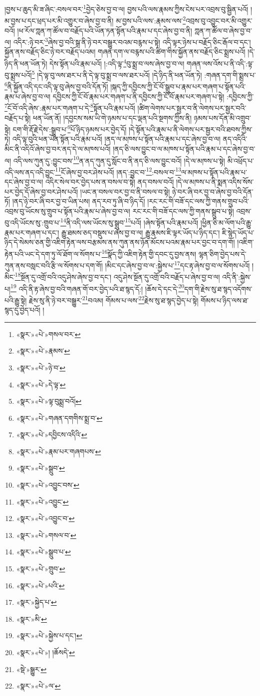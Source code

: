 །བྱས་པ་ཆུད་མི་ཟ་ཞིང་:བསལ་བར་\footnote{«སྣར་»«པེ་»གསལ་བར་}བྱེད་ཅེས་བྱ་བ་ལ། བྱས་པའི་ལས་རྣམས་ཀྱིས་ངེས་པར་འབྲས་བུ་སྦྱིན་པའོ། །མ་བྱས་པ་དང་ཕྲད་པར་མི་འགྱུར་བ་ཞེས་བྱ་བ་ནི། མ་བྱས་པའི་ལས་:རྣམས་ལས་\footnote{«སྣར་»«པེ་»རྣམས་}འབྲས་བུ་འབྱུང་བར་མི་འགྱུར་བའོ། །ཕ་རོལ་ཀླན་ཀ་ཚོལ་བ་བརྗོད་པའི་ཡོན་ཏན་སྟོན་པའི་རྣམ་པ་དང་ཞེས་བྱ་བ་ནི། ཀླན་ཀ་ཚོལ་བ་ཞེས་བྱ་བ་ལ། འདིར་:ཉེ་བར་\footnote{«སྣར་»«པེ་»ཉེ་བ་}ཞེས་བྱ་བའི་སྒྲ་ནི་ཉེ་བར་བསྒྱུར་བའམ་བརྙས་པ་སྟེ། འདི་ལྟར་ཉེས་པ་བརྗོད་ཅིང་རྒོལ་བ་དང་། སྐྱོན་ནས་བརྗོད་ཅིང་ཉེ་བར་བརྗོད་པའམ། གཞན་དག་ལ་བརྙས་པའི་ཚིག་གིས་སྐྱོན་ནས་བརྗོད་ཅིང་སྨྲས་པའོ། །དེ་ཉིད་ནི་ཕན་ཡོན་ཏེ། དེས་སྟོན་པའི་རྣམ་པའོ། །:འདི་ལྟ་\footnote{«སྣར་»«པེ་»དེ་ལྟ་}བུ་སྨྲ་བ་ལས་ཞེས་བྱ་བ་ལ། གཞན་ལས་འོས་པ་ནི་འདི་:ལྟ་བུ་སྨྲས་པའོ།\footnote{«སྣར་»«པེ་»ལྟ་བུསྨྲ་བའོ།} །དེ་ལྟ་བུ་ལས་ཐར་པ་ནི་དེ་ལྟ་བུ་སྨྲ་བ་ལས་ཐར་པའོ། །དེ་ཉིད་ནི་ཕན་ཡོན་ཏེ། :གཞན་དག་གི་སྨྲས་པ་\footnote{«སྣར་»«པེ་»གཞན་དགགིས་སྨྲ་བ་}ནི་སྐྱོན་འདི་དང་འདི་ལྟ་བུ་ཞེས་བྱ་བའི་དོན་ཏོ། །སྐད་ཀྱི་དབྱིངས་ཀྱི་ངོ་བོ་སྒྲུབ་པ་རྣམ་པར་གཞག་པ་སྟོན་པའི་རྣམ་པ་ཞེས་བྱ་བ་ལ། དབྱིངས་ཀྱི་ངོ་བོ་རྣམ་པར་གཞག་པ་ནི་དབྱིངས་ཀྱི་ངོ་བོ་རྣམ་པར་གཞག་པ་སྟེ། :དབྱིངས་ཀྱི་\footnote{«སྣར་»«པེ་»དབྱིངས་འདིའི་}ངོ་བོ་འདི་ཞེས་:རྣམ་པར་གཞག་པ་དེ་\footnote{«སྣར་»«པེ་»རྣམ་པར་གཞགཔས་}སྟོན་པའི་རྣམ་པའོ། །ཚིག་ལེགས་པར་སྦྱར་བ་ནི་ལེགས་པར་སྦྱར་བའི་བརྗོད་པ་སྟེ། ཕན་ཡོན་ནོ། །དབྱངས་སམ་ཡི་གེ་ཉམས་པ་དང་ལྡན་པའི་སྔགས་ཀྱིས་ནི། ཉམས་པས་དོན་མི་འགྲུབ་སྟེ། ངག་གི་རྡོ་རྗེ་དེས་:སྒྲུབ་པ་\footnote{«སྣར་»«པེ་»སྒྲུབ་}པོ་ཉིད་ཉམས་པར་བྱེད་དོ། །དེ་སྟོན་པའི་རྣམ་པ་ནི་ལེགས་པར་སྦྱར་བའི་ཐབས་ཀྱིས་ཏེ། འདི་ལྟ་བུའི་ཕན་ཡོན་སྟོན་པའི་རྣམ་པའོ། །ནད་ལ་མཁས་པ་སྟོན་པའི་རྣམ་པ་དང་ཞེས་བྱ་བ་ལ། ནད་འདིའི་མིང་ནི་འདིའོ་ཞེས་བྱ་བར་ནད་དེ་ལ་མཁས་པའོ། །ནད་ཅི་ལས་བྱུང་བ་ལ་མཁས་པ་སྟོན་པའི་རྣམ་པ་དང་ཞེས་བྱ་བ་ལ། འདི་ལས་ཀུན་དུ་:བྱུང་བས་\footnote{«སྣར་»«པེ་»འབྱུང་བས་}ན་ནད་ཀུན་དུ་སློང་བ་ནི་ནད་ཅི་ལས་བྱུང་བའོ། །དེ་ལ་མཁས་པ་སྟེ། མི་འཕྲོད་པ་འདི་ལས་ནད་འདི་བྱུང་\footnote{«སྣར་»«པེ་»འབྱུང་}ངོ་ཞེས་བྱ་བར་ཤེས་པའོ། །ནད་:བྱུང་བ་\footnote{«སྣར་»«པེ་»འབྱུང་བ་}:བསལ་བ་\footnote{«སྣར་»«པེ་»གསལ་བ་}ལ་མཁས་པ་སྟོན་པའི་རྣམ་པ་དང་ཞེས་བྱ་བ་ལ། འདིར་སེལ་བར་བྱེད་པས་ན་བསལ་བ་སྟེ། ནད་བསལ་བའོ། །དེ་ལ་མཁས་པ་ནི་སྨན་འདིས་སོས་པར་བྱེད་དོ་ཞེས་བྱ་བར་ཤེས་པའོ། །ཡང་ན་བསལ་བར་བྱ་བ་ནི་བསལ་བ་སྟེ། ཉེ་བར་ཞི་བར་བྱ་བ་ཞེས་བྱ་བའི་དོན་ཏོ། །ནད་ཉེ་བར་ཞི་བར་བྱ་བ་ཡིན་པས། ནད་རབ་ཏུ་ཞི་བ་ཉིད་དོ། །རང་རང་གི་བཟོ་དང་ལས་ཀྱི་གནས་གྲུབ་པའི་འབྲས་བུ་ཡོངས་སུ་གྲུབ་པ་སྟོན་པའི་རྣམ་པ་ཞེས་བྱ་བ་ལ། རང་རང་གི་བཟོ་དང་ལས་ཀྱི་གནས་སྒྲུབ་པ་སྟེ། འབྲས་བུ་འདི་ཡོངས་སུ་:གྲུབ་པ་\footnote{«སྣར་»«པེ་»སྒྲུབ་པ་}ནི་འདི་ལས་ཡོངས་སུ་སྒྲུབ་\footnote{«སྣར་»«པེ་»གྲུབ་}པའོ། །ཞེས་སྟོན་པའི་རྣམ་པའོ། །ཕྱིན་ཅི་མ་ལོག་པའི་རྒྱུ་རྣམ་པར་གཞག་པ་དང་། རྒྱུ་ཐམས་ཅད་བསྡུས་པ་ཞེས་བྱ་བ་ལ། རྒྱུ་རྣམས་ཇི་ལྟར་ཡོད་པ་ཉིད་དང་། ཇི་སྙེད་ཡོད་པ་ཉིད་དེ་སེམས་ཅན་གྱི་འཇིག་རྟེན་ལས་བརྩམས་ནས་ཀུན་ནས་ཉོན་མོངས་པའམ་རྣམ་པར་བྱང་བ་དག་གོ། །འཇིག་རྟེན་པའི་ཡང་དེ་དག་ཏུ་ལོ་ཐོག་ལ་སོགས་པ་\footnote{«སྣར་»«པེ་»པའི་}སྣོད་ཀྱི་འཇིག་རྟེན་གྱི་དབང་དུ་བྱས་ནས། ལྷན་ཅིག་བྱེད་པས་དེ་ཀུན་ནས་བསླང་བའི་རྩི་ལ་སོགས་པ་དག་གོ། །མིང་དང་ཞེས་བྱ་བ་ལ་:སྐྱེས་པ་\footnote{«སྣར་»སྐྱེད་པ་}དང་རྟ་ཞེས་བྱ་བ་ལ་སོགས་པའོ། །མིང་\footnote{«སྣར་»མི་}སྔོན་དུ་འགྲོ་བའི་འདུ་ཤེས་ཞེས་བྱ་བ་དང་། འདུ་ཤེས་སྔོན་དུ་འགྲོ་བའི་བརྗོད་པ་ཞེས་བྱ་བ་ལ། འདི་ནི་:སྐྱེས་པ།\footnote{«སྣར་»«པེ་»སྐྱེས་པ་དང་།} འདི་ནི་རྟ་ཞེས་བྱ་བའི་གཞན་གོ་བར་བྱེད་པའི་ཐ་སྙད་དོ:། །ཆོས་དེ་དང་དེ་\footnote{«སྣར་»«པེ་»། །ཆོསདེ་}དག་གི་རྗེས་སུ་ཐ་སྙད་འདོགས་པའི་རྒྱུ་སྟེ། རྗེས་སུ་ནི་ཉེ་བར་བསྒྱུར་\footnote{«སྡེ་»སྒྱུར་}བའམ། གོམས་པ་ལས་\footnote{«སྣར་»«པེ་»ལ་}རྗེས་སུ་ཐ་སྙད་བྱེད་པ་སྟེ། གོམས་པ་ཉིད་ལས་ཐ་སྙད་དུ་བྱེད་པའོ། །
